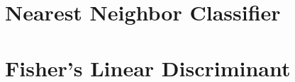 \documentclass[fleqn]{article}
\begin{document}
	\pagebreak
	\appendix
	\section{Nearest Neighbor Classifier}
	\label{nearest_neighbor}
	\lstset{style=Matlab-editor,basicstyle=\ttfamily\footnotesize}
	
	\raggedbottom
	\pagebreak
	\section{Fisher's Linear Discriminant}
	\label{fisher_ldf}
	\lstset{style=Matlab-editor,basicstyle=\ttfamily\footnotesize}
	
	\raggedbottom
\end{document}
